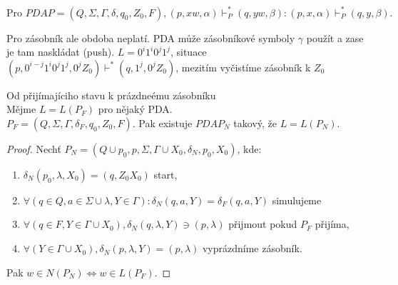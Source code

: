 \documentclass[../main.tex]{subfiles}
\begin{document}
    \begin{remark}
        \[\text{Pro } PDA P = (Q,\Sigma,\Gamma, \delta, q_0, Z_0, F), (p, xw, \alpha) \vdash^*_P (q, yw, \beta) : (p,x,\alpha)\vdash^*_P (q,y,\beta).\]

        Pro zásobník ale obdoba neplatí. PDA  může zásobníkové symboly $\gamma$ použít a zase je tam naskládat (push).
        $L = {0^i1^i0^j1^j}$, situace $(p, 0^{i-j}1^i0^j1^j, 0^jZ_0)\vdash^* (q,1^j, 0^j Z_0)$, mezitím vyčistíme zásobník k $Z_0$
    \end{remark}

    \begin{theorem}
        Od přijímajíciho stavu k prázdneému zásobníku\\

        Mějme $L = L(P_F)$ pro nějaký PDA.\\

        $P_F = (Q,\Sigma, \Gamma, \delta_F, q_0, Z_0, F)$. Pak existuje $PDA P_N$ takový, že $L = L(P_N)$.

        \begin{proof}
            Nechť $P_N = (Q \cup {p_0, p}, \Sigma, \Gamma \cup {X_0}, \delta_N, p_0, X_0)$, kde:
            \begin{enumerate}
                \item $\delta_N(p_0,\lambda, X_0) = {(q,Z_0X_0)}$ start,
                \item $\forall(q\in Q, a \in \Sigma \cup {\lambda}, Y \in \Gamma) : \delta_N(q,a,Y) = \delta_F(q,a,Y)$ simulujeme
                \item $\forall(q \in F, Y \in \Gamma \cup {X_0}), \delta_N(q,\lambda, Y) \ni {(p,\lambda)}$ přijmout pokud $P_F$ přijíma,
                \item $\forall (Y \in \Gamma \cup {X_0}), \delta_N(p,\lambda, Y) = {(p,\lambda)}$ vyprázdníme zásobník. 
            \end{enumerate}
            Pak $w\in N(P_N) \Leftrightarrow w\in L(P_F).$
        \end{proof}
    \end{theorem}
\end{document}
